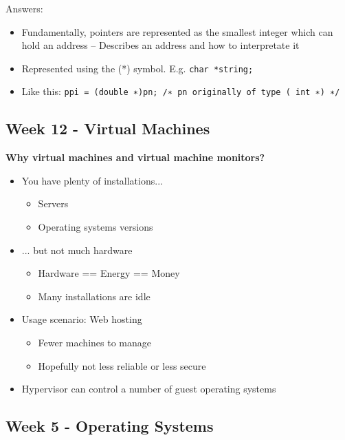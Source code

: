 Answers:

\begin{itemize}
\item  Fundamentally, pointers are represented as the smallest integer which can hold an address
– Describes an address and how to interpretate it
\item Represented using the (*) symbol. E.g. {\tt char *string; }
\item Like this: {\tt <++>ppi = (double ∗)pn; /∗ pn originally of type ( int ∗) ∗/ }
\end{itemize}




\subsection*{Week 12 - Virtual Machines}
\textbf{Why virtual machines and virtual machine monitors?}

\begin{itemize}
	\item You have plenty of installations...
	\begin{itemize}
		\item Servers
		\item Operating systems versions
	\end{itemize}

	\item ... but not much hardware
	\begin{itemize}
		\item Hardware == Energy == Money
		\item Many installations are idle
	\end{itemize}
	\item Usage scenario: Web hosting
	\begin{itemize}
		\item Fewer machines to manage
		\item Hopefully not less reliable or less secure
	\end{itemize}
	\item Hypervisor can control a number of guest operating systems
\end{itemize}

\subsection*{Week 5 - Operating Systems}


